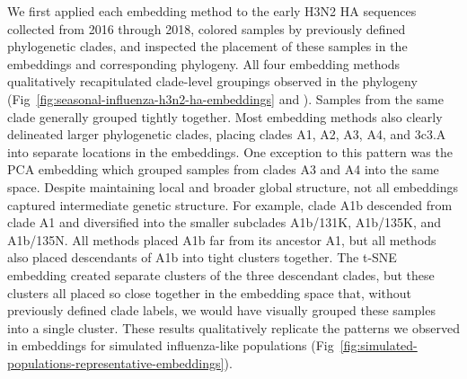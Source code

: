 \documentclass[10pt,letterpaper]{article}
\begin{document}
We first applied each embedding method to the early H3N2 HA sequences collected from 2016 through 2018, colored samples by previously defined phylogenetic clades, and inspected the placement of these samples in the embeddings and corresponding phylogeny.
All four embedding methods qualitatively recapitulated clade-level groupings observed in the phylogeny (Fig~\ref{fig:seasonal-influenza-h3n2-ha-embeddings} and ).
Samples from the same clade generally grouped tightly together.
Most embedding methods also clearly delineated larger phylogenetic clades, placing clades A1, A2, A3, A4, and 3c3.A into separate locations in the embeddings.
One exception to this pattern was the PCA embedding which grouped samples from clades A3 and A4 into the same space.
Despite maintaining local and broader global structure, not all embeddings captured intermediate genetic structure.
For example, clade A1b descended from clade A1 and diversified into the smaller subclades A1b/131K, A1b/135K, and A1b/135N.
All methods placed A1b far from its ancestor A1, but all methods also placed descendants of A1b into tight clusters together.
The t-SNE embedding created separate clusters of the three descendant clades, but these clusters all placed so close together in the embedding space that, without previously defined clade labels, we would have visually grouped these samples into a single cluster.
These results qualitatively replicate the patterns we observed in embeddings for simulated influenza-like populations (Fig~\ref{fig:simulated-populations-representative-embeddings}).

\end{document}

